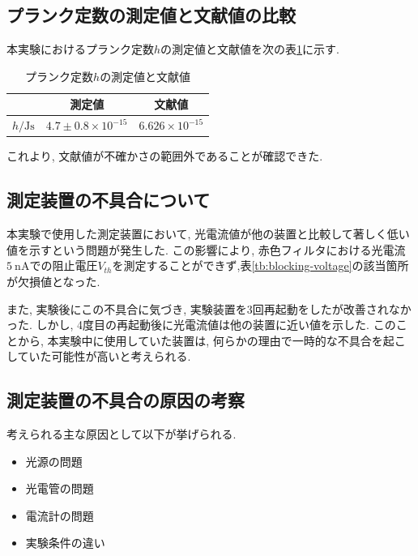 \documentclass{jarticle}
\begin{document}
\subsection{プランク定数の測定値と文献値の比較}

本実験におけるプランク定数$h$の測定値と文献値を次の表\ref{tb:h-value}に示す.

\begin{table}[H]
  \centering
  \caption{プランク定数$h$の測定値と文献値}
  \label{tb:h-value}
  \begin{tabular}{ccc}
    \hline
    & 測定値 & 文献値\cite{SI} \\
    \hline
    $h/\mathrm{Js}$ & $4.7\pm0.8\times10^{-15}$ & $6.626\times10^{-15}$ \\
    \hline
  \end{tabular}
\end{table}

これより, 文献値が不確かさの範囲外であることが確認できた.



\subsection{測定装置の不具合について}

本実験で使用した測定装置において, 光電流値が他の装置と比較して著しく低い値を示すという問題が発生した.
この影響により, 赤色フィルタにおける光電流$5\ \mathrm{nA}$での阻止電圧$V_{th}$を測定することができず,表\ref{tb:blocking-voltage}の該当箇所が欠損値となった.

また, 実験後にこの不具合に気づき, 実験装置を3回再起動をしたが改善されなかった.
しかし, 4度目の再起動後に光電流値は他の装置に近い値を示した.
このことから, 本実験中に使用していた装置は, 何らかの理由で一時的な不具合を起こしていた可能性が高いと考えられる.



\subsection{測定装置の不具合の原因の考察}

考えられる主な原因として以下が挙げられる.

\begin{itemize}
  \item 光源の問題
  \item 光電管の問題
  \item 電流計の問題
  \item 実験条件の違い
\end{itemize}
\end{document}

